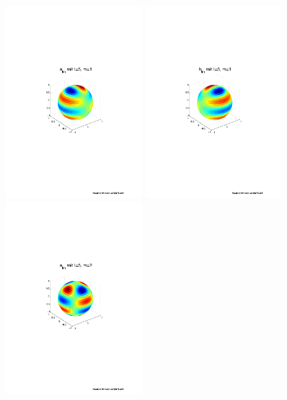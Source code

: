 \begin{refsection}
\begin{figure}
\includegraphics[width=0.45\textwidth]{kugel/ylm/a_5_1.pdf}
\includegraphics[width=0.45\textwidth]{kugel/ylm/b_5_1.pdf}
\includegraphics[width=0.45\textwidth]{kugel/ylm/a_5_2.pdf}

\end{figure}
\end{refsection}
